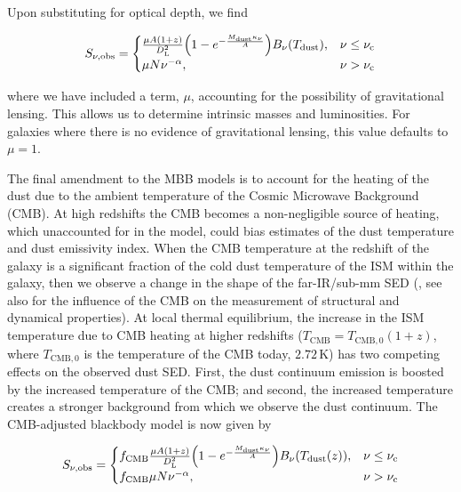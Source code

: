 Upon substituting for optical depth, we find 

\begin{equation}
	S_{\nu, \textrm{obs}} =  
	\begin{cases}
		\frac{\mu A (1+z)}{D_{\rm L}^2} \Big(1- e^{-\frac{M_{\textrm{dust}}\kappa_\nu}{A}}\Big) B_\nu(T_{\textrm{dust}}), & \nu \le \nu_{\rm c} \\
		\mu N \nu^{-\alpha}, & \nu > \nu_{\rm c} \\
	\end{cases}
\end{equation}

\noindent where we have included a term, $\mu$, accounting for the possibility of gravitational lensing. This allows us to determine intrinsic masses and luminosities. For galaxies where there is no evidence of gravitational lensing, this value defaults to $\mu = 1$.

The final amendment to the MBB models is to account for the heating of the dust due to the ambient temperature of the Cosmic Microwave Background (CMB). At high redshifts the CMB becomes a non-negligible source of heating, which unaccounted for in the model, could bias estimates of the dust temperature and dust emissivity index. When the CMB temperature at the redshift of the galaxy is a significant fraction of the cold dust temperature of the ISM within the galaxy, then we observe a change in the shape of the far-IR/sub-mm SED (\citealt{daCunha_2013}, see also \citealt{Zhang_2016} for the influence of the CMB on the measurement of structural and dynamical properties). At local thermal equilibrium, the increase in the ISM temperature due to CMB heating at higher redshifts ($T_{\textrm{CMB}} = T_{\textrm{CMB}, 0}(1+z)$, where $T_{\textrm{CMB}, 0}$ is the temperature of the CMB today, $2.72\,$K) has two competing effects on the observed dust SED. First, the dust continuum emission is boosted by the increased temperature of the CMB; and second, the increased temperature creates a stronger background from which we observe the dust continuum. The CMB-adjusted blackbody model is now given by 

\begin{equation}
	S_{\nu, \textrm{obs}} =  
	\begin{cases}
		f_{\textrm{CMB}}\frac{\mu A (1+z)}{D_{\rm L}^2} \Big(1- e^{-\frac{M_{\textrm{dust}}\kappa_\nu}{A}}\Big) B_\nu(T_{\textrm{dust}}(z)), & \nu \le \nu_{\rm c} \\
		f_{\textrm{CMB}} \mu N \nu^{-\alpha}, & \nu > \nu_{\rm c} \\
	\end{cases}
	\label{eq:modified_blackbody_general_opacity_a_cmb}
\end{equation}


